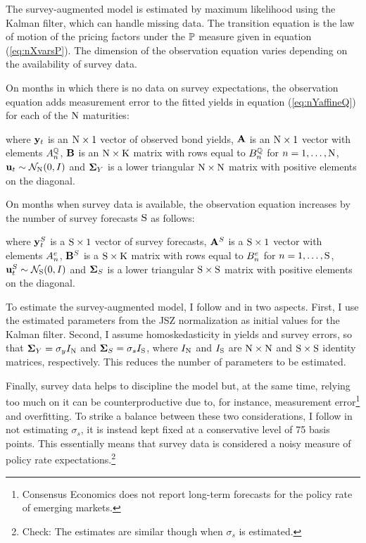 {The survey-augmented model is estimated by maximum likelihood using the Kalman filter, which can handle missing data. 
The transition equation is the law of motion of the pricing factors under the \(\mathbb{P}\) measure given in equation (\ref{eq:nXvarsP}).
The dimension of the observation equation varies depending on the availability of survey data. 

On months in which there is no data on survey expectations, the observation equation adds measurement error to the fitted yields in equation (\ref{eq:nYaffineQ}) for each of the \(\mathrm{N}\) maturities:
	
\noindent where \(\mathbf{y}_{t}\) is an \(\mathrm{N} \times 1\) vector of observed bond yields, \(\mathbf{A}\) is an \(\mathrm{N} \times 1\) vector with elements \(A_{n}^{\mathbb{Q}}\), \(\mathbf{B}\) is an \(\mathrm{N} \times \mathrm{K}\) matrix with rows equal to \(B_{n}^{\mathbb{Q}}\) for \(n = 1, \ldots, \mathrm{N}\), \(\mathbf{u}_{t} \sim \mathcal{N}_{\mathrm{N}} (0,I) \) and \(\mathbf{\mathbf{\Sigma}}_{Y}\) is a lower triangular \(\mathrm{N} \times \mathrm{N}\) matrix with positive elements on the diagonal.

On months when survey data is available, the observation equation increases by the number of survey forecasts \(\mathrm{S}\) as follows:
	
\noindent where \(\mathbf{y}_{t}^{S}\) is a \(\mathrm{S} \times 1\) vector of survey forecasts, \(\mathbf{A}^{S}\) is a \(\mathrm{S} \times 1\) vector with elements \(A_{n}^{e}\), \(\mathbf{B}^{S}\) is a \(\mathrm{S} \times \mathrm{K}\) matrix with rows equal to \(B_{n}^{e}\) for \(n = 1, \ldots, \mathrm{S}\), \(\mathbf{u}_{t}^{S} \sim \mathcal{N}_{\mathrm{S}} (0,I) \) and \(\mathbf{\mathbf{\Sigma}}_{S}\) is a lower triangular \(\mathrm{S} \times \mathrm{S}\) matrix with positive elements on the diagonal.

To estimate the survey-augmented model, I follow \cite{Guimaraes:2014} and \cite{Lloyd:2018b} in two aspects. First, I use the estimated parameters from the JSZ normalization as initial values for the Kalman filter.
Second, I assume homoskedasticity in yields and survey errors, so that \(\mathbf{\mathbf{\Sigma}}_{Y} = \sigma_y I_{\mathrm{N}}\) and \(\mathbf{\mathbf{\Sigma}}_{S} = \sigma_s I_{\mathrm{S}}\), where \(I_{\mathrm{N}}\) and \(I_{\mathrm{S}}\) are \(\mathrm{N} \times \mathrm{N}\) and \(\mathrm{S} \times \mathrm{S}\) identity matrices, respectively.
This reduces the number of parameters to be estimated.

Finally, survey data helps to discipline the model but, at the same time, relying too much on it can be counterproductive due to, for instance, measurement error\footnote{ Consensus Economics does not report long-term forecasts for the policy rate of emerging markets.} and overfitting. 
To strike a balance between these two considerations, I follow \cite{KimWright:2005} in not estimating \(\sigma_s\), it is instead kept fixed at a conservative level of 75 basis points. This essentially means that survey data is considered a noisy measure of policy rate expectations.\footnote{ Check: The estimates are similar though when \(\sigma_s\) is estimated.}


}

